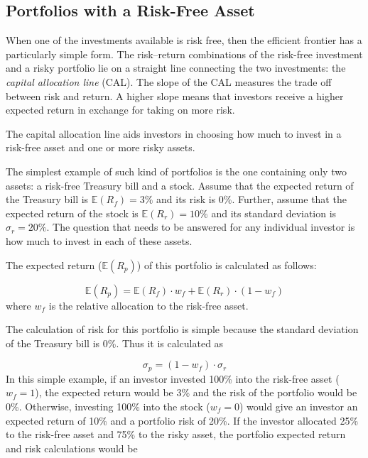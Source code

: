 \subsection{Portfolios with a Risk-Free Asset}
\label{portfolios-with-a-risk-free-asset}

When one of the investments available is risk free, then the efficient frontier has a particularly simple form. The risk–return combinations of the risk-free investment and a risky portfolio lie on a straight line connecting the two investments: the \emph{capital allocation line} (CAL). The slope of the CAL measures the trade off between risk and return. A higher slope means that investors receive a higher expected return in exchange for taking on more risk.

The capital allocation line aids investors in choosing how much to invest in a risk-free asset and one or more risky assets.

The simplest example of such kind of portfolios is the one containing only two assets: a risk-free Treasury bill and a stock. Assume that the expected return of the Treasury bill is \(\mathbb{E}(R_f)=3\%\) and its risk is 0\%. Further, assume that the expected return of the stock is \(\mathbb{E}(R_r)=10\%\) and its standard deviation is \(\sigma_r=20\%\). The question that needs to be answered for any individual investor is how much to invest in each of these
assets.

The expected return (\(\mathbb{E}(R_p)\)) of this portfolio is calculated as follows:

\begin{equation*} 
	\mathbb{E}(R_p) = \mathbb{E}(R_f)\cdot w_f + \mathbb{E}(R_r)\cdot (1- w_f) 
\end{equation*}
where \(w_f\) is the relative allocation to the risk-free asset.

The calculation of risk for this portfolio is simple because the standard deviation of the Treasury bill is 0\%. Thus it is calculated as

\begin{equation*} 
	\sigma_p = (1-w_f)\cdot \sigma_r 
\end{equation*}
In this simple example, if an investor invested 100\% into the risk-free asset (\(w_f=1\)), the expected return would be 3\% and the risk of the portfolio would be 0\%. Otherwise, investing 100\% into the stock (\(w_f=0\)) would give an investor an expected return of 10\% and a portfolio risk of 20\%. If the investor allocated 25\% to the risk-free asset and 75\% to the risky asset, the portfolio expected return and risk calculations would be

